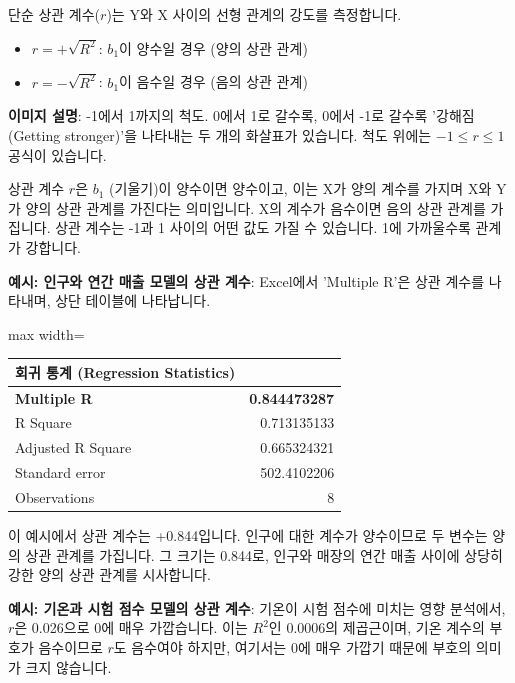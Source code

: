 \documentclass[11pt,a4paper]{article}
\theoremstyle{definition}
\begin{document}
\begin{tcolorbox}[infobox, title=단순 상관 계수 (Simple Correlation Coefficient, $r$)]
단순 상관 계수($r$)는 Y와 X 사이의 선형 관계의 강도를 측정합니다.
\begin{itemize}
    \item $r = +\sqrt{R^2}$: $b_1$이 양수일 경우 (양의 상관 관계)
    \item $r = -\sqrt{R^2}$: $b_1$이 음수일 경우 (음의 상관 관계)
\end{itemize}
\begin{center}
\end{center}
\textbf{이미지 설명}: -1에서 1까지의 척도. 0에서 1로 갈수록, 0에서 -1로 갈수록 '강해짐(Getting stronger)'을 나타내는 두 개의 화살표가 있습니다. 척도 위에는 $-1 \le r \le 1$ 공식이 있습니다.

상관 계수 $r$은 $b_1$ (기울기)이 양수이면 양수이고, 이는 X가 양의 계수를 가지며 X와 Y가 양의 상관 관계를 가진다는 의미입니다. X의 계수가 음수이면 음의 상관 관계를 가집니다. 상관 계수는 -1과 1 사이의 어떤 값도 가질 수 있습니다. 1에 가까울수록 관계가 강합니다.

\textbf{예시: 인구와 연간 매출 모델의 상관 계수}:
Excel에서 'Multiple R'은 상관 계수를 나타내며, 상단 테이블에 나타납니다.
\begin{adjustbox}{max width=\textwidth}
\begin{tabular}{lr}
\toprule
\textbf{회귀 통계 (Regression Statistics)} & \\
\midrule
\textbf{Multiple R} & \textbf{0.844473287} \\
R Square & 0.713135133 \\
Adjusted R Square & 0.665324321 \\
Standard error & 502.4102206 \\
Observations & 8 \\
\bottomrule
\end{tabular}
\end{adjustbox}
이 예시에서 상관 계수는 +0.844입니다. 인구에 대한 계수가 양수이므로 두 변수는 양의 상관 관계를 가집니다. 그 크기는 0.844로, 인구와 매장의 연간 매출 사이에 상당히 강한 양의 상관 관계를 시사합니다.

\textbf{예시: 기온과 시험 점수 모델의 상관 계수}:
기온이 시험 점수에 미치는 영향 분석에서, $r$은 0.026으로 0에 매우 가깝습니다. 이는 $R^2$인 0.0006의 제곱근이며, 기온 계수의 부호가 음수이므로 $r$도 음수여야 하지만, 여기서는 0에 매우 가깝기 때문에 부호의 의미가 크지 않습니다.


\end{tcolorbox}
\end{document}
